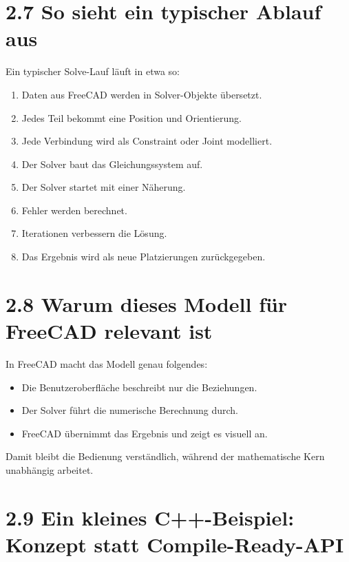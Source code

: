 \documentclass[
  12pt
]{book}
\providecommand{\tightlist}{%
  \setlength{\itemsep}{0pt}\setlength{\parskip}{0pt}}
\begin{document}
\hypertarget{so-sieht-ein-typischer-ablauf-aus}{%
\section{\texorpdfstring{{2.7} So sieht ein typischer Ablauf
aus}{2.7 So sieht ein typischer Ablauf aus}}\label{so-sieht-ein-typischer-ablauf-aus}}

Ein typischer Solve-Lauf läuft in etwa so:

\begin{enumerate}
\def\labelenumi{\arabic{enumi}.}
\tightlist
\item
  Daten aus FreeCAD werden in Solver-Objekte übersetzt.
\item
  Jedes Teil bekommt eine Position und Orientierung.
\item
  Jede Verbindung wird als Constraint oder Joint modelliert.
\item
  Der Solver baut das Gleichungssystem auf.
\item
  Der Solver startet mit einer Näherung.
\item
  Fehler werden berechnet.
\item
  Iterationen verbessern die Lösung.
\item
  Das Ergebnis wird als neue Platzierungen zurückgegeben.
\end{enumerate}

\hypertarget{warum-dieses-modell-fuxfcr-freecad-relevant-ist}{%
\section{\texorpdfstring{{2.8} Warum dieses Modell für FreeCAD relevant
ist}{2.8 Warum dieses Modell für FreeCAD relevant ist}}\label{warum-dieses-modell-fuxfcr-freecad-relevant-ist}}

In FreeCAD macht das Modell genau folgendes:

\begin{itemize}
\tightlist
\item
  Die Benutzeroberfläche beschreibt nur die Beziehungen.
\item
  Der Solver führt die numerische Berechnung durch.
\item
  FreeCAD übernimmt das Ergebnis und zeigt es visuell an.
\end{itemize}

Damit bleibt die Bedienung verständlich, während der mathematische Kern
unabhängig arbeitet.

\hypertarget{ein-kleines-c-beispiel-konzept-statt-compile-ready-api}{%
\section{\texorpdfstring{{2.9} Ein kleines C++-Beispiel: Konzept statt
Compile-Ready-API}{2.9 Ein kleines C++-Beispiel: Konzept statt Compile-Ready-API}}\label{ein-kleines-c-beispiel-konzept-statt-compile-ready-api}}
\end{document}

